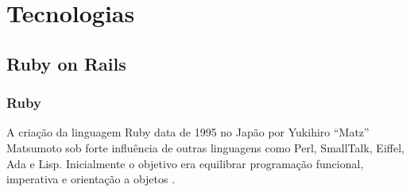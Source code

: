 \chapter{Tecnologias}
\label{cap:tecnologias}
\section{Ruby on Rails}
\subsection{Ruby}
    \par A criação da linguagem Ruby data de 1995 no Japão por Yukihiro ``Matz'' Matsumoto sob forte influência de outras linguagens como Perl, SmallTalk, Eiffel, Ada e Lisp.  Inicialmente o objetivo era equilibrar programação funcional, imperativa e orientação a objetos \citep{rubydocs}.
